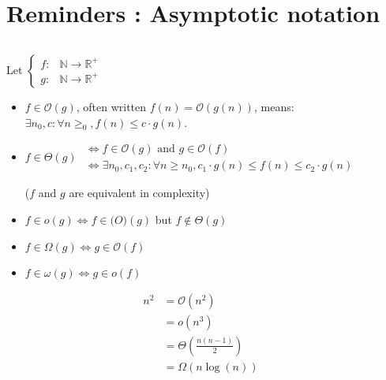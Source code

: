 

\part*{Reminders : Asymptotic notation}

\paragraph{}

Let 
$ \left\{
\begin{array}{ll}
f :& \mathbb{N} \rightarrow \mathbb{R}^+\\
g :& \mathbb{N} \rightarrow \mathbb{R}^+
\end{array} \right.$ 

\begin{itemize}
\renewcommand{\labelitemi}{$\bullet$}
	\item  $f \in \mathcal{O}(g)$, often written $f(n) = \mathcal{O}(g(n))$, means: $\exists n_0, c : \forall n \geq _0, f(n) \leq c \cdot g(n)$.
	\item 	
	$f \in \Theta(g)$ $\begin{array}{l} 
	   \Leftrightarrow f \in \mathcal{O}(g)  \text{ and } g \in \mathcal{O}(f) \\
	\Leftrightarrow  \exists n_0, c_1, c_2 : \forall n\geq n_0, c_1 \cdot g(n)\leq f(n) \leq c_2 \cdot g(n) 
	\end{array}$
		
	($f$ and $g$ are equivalent in complexity)

\item $f \in o(g) \Leftrightarrow f \in \mathcal(O)(g)$ but $f \notin \Theta(g)$
\item  $f \in \Omega(g) \Leftrightarrow g \in \mathcal{O}(f)$
\item $f \in \omega(g) \Leftrightarrow g \in o(f)$
\end{itemize}


\begin{example}

\begin{align*} 
	   n^2 & = \mathcal{O}(n^2) &\\
		 & = o(n^3) &\\
		 & = \Theta \left(\frac{n (n-1)}{2}\right) &\\
		& = \Omega (n \log (n))& 
	\end{align*}

\end{example}

